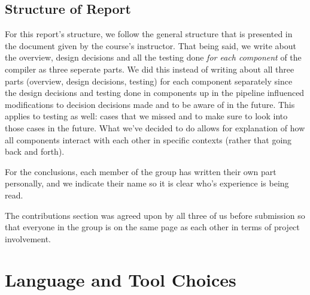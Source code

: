 \documentclass{article}
\begin{document}


\subsection{Structure of Report}

For this report's structure, we follow the general structure that is presented in the document given by the course's instructor. That being said, we write about the overview, design decisions and all the testing done \textit{for each component} of the compiler as three seperate parts. We did this instead of writing about all three parts (overview, design decisions, testing) for each component separately since the design decisions and testing done in components up in the pipeline influenced modifications to decision decisions made and to be aware of in the future. This applies to testing as well: cases that we missed and to make sure to look into those cases in the future. What we've decided to do allows for explanation of how all components interact with each other in specific contexts (rather that going back and forth).



For the conclusions, each member of the group has written their own part personally, and we indicate their name so it is clear who's experience is being read.


The contributions section was agreed upon by all three of us before submission so that everyone in the group is on the same page as each other in terms of project involvement.


\section{Language and Tool Choices}
\end{document}

